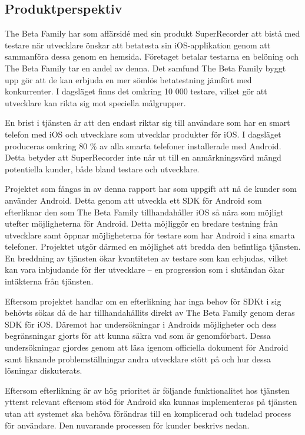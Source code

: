 \subsection{Produktperspektiv}
\label{subsec:perspective}

The Beta Family har som affärsidé med sin produkt SuperRecorder att bistå med testare när utvecklare önskar att betatesta sin iOS-applikation genom att sammanföra dessa genom en hemsida. Företaget betalar testarna en belöning och The Beta Family tar en andel av denna. Det samfund The Beta Family byggt upp gör att de kan erbjuda en mer sömlös betatestning jämfört med konkurrenter. I dagsläget finns det omkring 10 000 testare, vilket gör att utvecklare kan rikta sig mot speciella målgrupper.

En brist i tjänsten är att den endast riktar sig till användare som har en smart telefon med iOS och utvecklare som utvecklar produkter för iOS. I dagsläget produceras omkring 80 \% av alla smarta telefoner installerade med Android\parencite{ http://www.idc.com/getdoc.jsp?containerId=prUS24442013}. Detta betyder att SuperRecorder inte når ut till en anmärkningsvärd mängd potentiella kunder, både bland testare och utvecklare.

Projektet som fångas in av denna rapport har som uppgift att nå de kunder som använder Android. Detta genom att utveckla ett SDK för Android som efterliknar den som The Beta Family tillhandahåller iOS så nära som möjligt utefter möjligheterna för Android. Detta möjliggör en bredare testning från utvecklare samt öppnar möjligheterna för testare som har Android i sina smarta telefoner. Projektet utgör därmed en möjlighet att bredda den befintliga tjänsten. En breddning av tjänsten ökar kvantiteten av testare som kan erbjudas, vilket kan vara inbjudande för fler utvecklare – en progression som i slutändan ökar intäkterna från tjänsten.

Eftersom projektet handlar om en efterlikning har inga behov för SDKt i sig behövts sökas då de har tillhandahållits direkt av The Beta Family genom deras SDK för iOS. Däremot har undersökningar i Androids möjligheter och dess begränsningar gjorts för att kunna säkra vad som är genomförbart. Dessa undersökningar gjordes genom att läsa igenom officiella dokument för Android samt liknande problemställningar andra utvecklare stött på och hur dessa lösningar diskuterats.

Eftersom efterlikning är av hög prioritet är följande funktionalitet hos tjänsten ytterst relevant eftersom stöd för Android ska kunnas implementeras på tjänsten utan att systemet ska behöva förändras till en komplicerad och tudelad process för användare. Den nuvarande processen för kunder beskrivs nedan.

